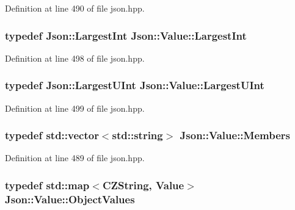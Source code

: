 Definition at line 490 of file json.\-hpp.

\hypertarget{class_json_1_1_value_a1cbb82642ed05109b9833e49f042ece7}{
\subsubsection[{Largest\-Int}]{\setlength{\rightskip}{0pt plus 5cm}typedef {\bf Json\-::\-Largest\-Int} {\bf Json\-::\-Value\-::\-Largest\-Int}}}\label{class_json_1_1_value_a1cbb82642ed05109b9833e49f042ece7}


Definition at line 498 of file json.\-hpp.

\hypertarget{class_json_1_1_value_a6682a3684d635e03fc06ba229fa24eec}{
\subsubsection[{Largest\-U\-Int}]{\setlength{\rightskip}{0pt plus 5cm}typedef {\bf Json\-::\-Largest\-U\-Int} {\bf Json\-::\-Value\-::\-Largest\-U\-Int}}}\label{class_json_1_1_value_a6682a3684d635e03fc06ba229fa24eec}


Definition at line 499 of file json.\-hpp.

\hypertarget{class_json_1_1_value_ac61bab5a465848b57610379cc07995c3}{
\subsubsection[{Members}]{\setlength{\rightskip}{0pt plus 5cm}typedef std\-::vector$<$std\-::string$>$ {\bf Json\-::\-Value\-::\-Members}}}\label{class_json_1_1_value_ac61bab5a465848b57610379cc07995c3}


Definition at line 489 of file json.\-hpp.

\hypertarget{class_json_1_1_value_a08b6c80c3af7071d908dabf044de5388}{
\subsubsection[{Object\-Values}]{\setlength{\rightskip}{0pt plus 5cm}typedef std\-::map$<$C\-Z\-String, {\bf Value}$>$ {\bf Json\-::\-Value\-::\-Object\-Values}}}\label{class_json_1_1_value_a08b6c80c3af7071d908dabf044de5388}


